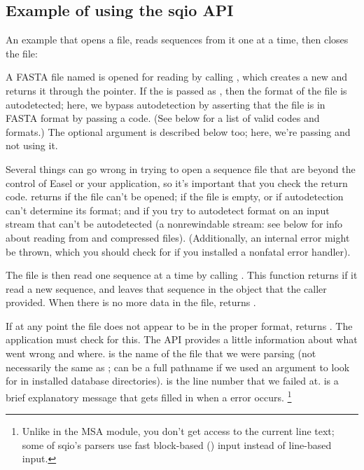 \subsection{Example of using the sqio API}

An example that opens a file, reads sequences from it one at a time,
then closes the file:



A FASTA file named  is opened for reading by calling
, which
creates a new  and returns it through the
 pointer. If the  is passed as
, then the format of the file is
autodetected; here, we bypass autodetection by asserting that the file
is in FASTA format by passing a  code. (See
below for a list of valid codes and formats.) The optional 
argument is described below too; here, we're passing  and
not using it.

Several things can go wrong in trying to open a sequence file that are
beyond the control of Easel or your application, so it's important
that you check the return code.   returns
 if the file can't be opened; 
if the file is empty, or if autodetection can't determine its format;
and  if you try to autodetect format on an input
stream that can't be autodetected (a nonrewindable stream: see below
for info about reading from  and compressed
files). (Additionally, an internal error might be thrown, which you
should check for if you installed a nonfatal error handler).

The file is then read one sequence at a time by calling
. This function returns 
if it read a new sequence, and leaves that sequence in the 
object that the caller provided.  When there is no more data in the
file,  returns . 

If at any point the file does not appear to be in the proper format,
 returns . The application
must check for this. The API provides a little information about what
went wrong and where.  is the name of the file
that we were parsing (not necessarily the same as ;
 can be a full pathname if we used an
 argument to look for  in installed database
directories).  is the line number that we
failed at.  is a brief explanatory message that
gets filled in when a  error occurs.
  \footnote{Unlike in the MSA module, you don't get access to the
  current line text; some of sqio's parsers use fast block-based
  () input instead of line-based input.}

